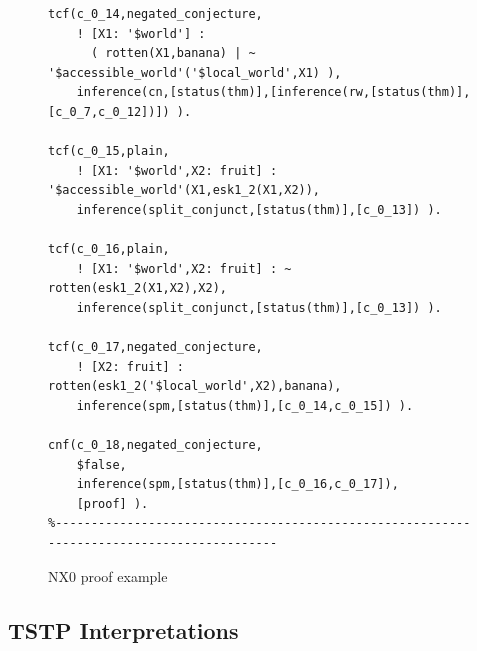 \documentclass{ceurart}
\begin{document}
\begin{figure}[h!]
{{\begin{verbatim}
tcf(c_0_14,negated_conjecture,
    ! [X1: '$world'] :
      ( rotten(X1,banana) | ~ '$accessible_world'('$local_world',X1) ),
    inference(cn,[status(thm)],[inference(rw,[status(thm)],[c_0_7,c_0_12])]) ).

tcf(c_0_15,plain,
    ! [X1: '$world',X2: fruit] : '$accessible_world'(X1,esk1_2(X1,X2)),
    inference(split_conjunct,[status(thm)],[c_0_13]) ).

tcf(c_0_16,plain,
    ! [X1: '$world',X2: fruit] : ~ rotten(esk1_2(X1,X2),X2),
    inference(split_conjunct,[status(thm)],[c_0_13]) ).

tcf(c_0_17,negated_conjecture,
    ! [X2: fruit] : rotten(esk1_2('$local_world',X2),banana),
    inference(spm,[status(thm)],[c_0_14,c_0_15]) ).

cnf(c_0_18,negated_conjecture,
    $false,
    inference(spm,[status(thm)],[c_0_16,c_0_17]),
    [proof] ).
%------------------------------------------------------------------------------------------
\end{verbatim}
}}
\caption{NX0 proof example}
\label{NX0Proof}
\end{figure}

\subsection{TSTP Interpretations}
\label{TSTPInterpretations}
\end{document}
